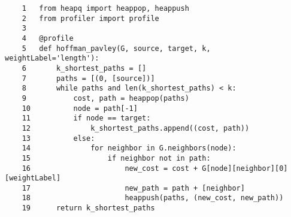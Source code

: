 \documentclass{article}
\begin{document}
\lstset{language=Pascal}          %

\begin{lstlisting}
    1 	from heapq import heappop, heappush
    2 	from profiler import profile
    3 	
    4 	@profile
    5 	def hoffman_pavley(G, source, target, k, weightLabel='length'):
    6 	    k_shortest_paths = []
    7 	    paths = [(0, [source])]
    8 	    while paths and len(k_shortest_paths) < k:
    9 	        cost, path = heappop(paths)
    10 	        node = path[-1]
    11 	        if node == target:
    12 	            k_shortest_paths.append((cost, path))
    13 	        else:
    14 	            for neighbor in G.neighbors(node):
    15 	                if neighbor not in path:
    16 	                    new_cost = cost + G[node][neighbor][0][weightLabel]
    17 	                    new_path = path + [neighbor]
    18 	                    heappush(paths, (new_cost, new_path))
    19 	    return k_shortest_paths
    
    
    
\end{lstlisting}
\end{document}
